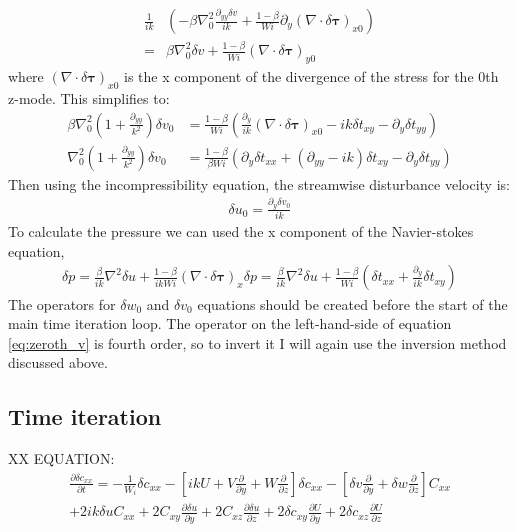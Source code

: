 \documentclass[12pt,a4paper]{article}
\newcommand{\dy}[1]{\frac{\partial #1}{\partial y}}
\newcommand{\dz}[1]{\frac{\partial #1}{\partial z}}
\newcommand{\dt}[1]{\frac{\partial #1}{\partial t}}
\newcommand{\scxy}{\delta c_{xy}}
\newcommand{\scxz}{\delta c_{xz}}
\newcommand{\stxx}{\delta t_{xx}}
\newcommand{\styy}{\delta t_{yy}}
\newcommand{\stxy}{\delta t_{xy}}
\newcommand{\su}{\delta u}
\newcommand{\sv}{\delta v}
\newcommand{\sw}{\delta w}
\newcommand{\spr}{\delta p}
\newcommand{\Wi}{\frac{1}{W_{i}}}
\newcommand{\first}[2]{-\Wi \delta c_{#1 #2} - \left[ ikU
+ V\frac{\partial}{\partial y} + W\frac{\partial}{\partial z} \right] \delta c_{#1 #2} 
- \left[ \sv\frac{\partial }{\partial y} + \sw\frac{\partial }{\partial z} \right] C_{#1 #2}}
\newcommand{\dd}[1]{\partial_{#1}}
\begin{document}
\begin{align}
    \frac{1}{ik} & \left( - \beta \nabla_{0}^{2} \frac{\dd{yy} \sv}{ik} + \frac{1-\beta}{Wi} \dd{y} \left( \nabla \cdot \delta \mathbf{\tau} \right)_{x0} \right) \nonumber\\
    = & \beta \nabla_{0}^{2} \sv + \frac{1-\beta}{Wi}\left( \nabla \cdot \delta \mathbf{\tau} \right)_{y0} 
\end{align}
where $\left( \nabla \cdot \delta \mathbf{\tau} \right)_{x0}$ is the x component of the divergence of the stress for the 0th z-mode. This simplifies to:
\begin{align}
    \beta\nabla_{0}^{2}\left( 1+ \frac{\dd{yy}}{k^{2}} \right)\sv_{0} &= \frac{1-\beta}{Wi}\left( \frac{\dd{y}}{ik} \left( \nabla \cdot \delta \mathbf{\tau} \right)_{x0} - ik\stxy - \dd{y}\styy \right) \nonumber \\
    \nabla_{0}^{2}\left( 1+ \frac{\dd{yy}}{k^{2}} \right)\sv_{0} &= \frac{1-\beta}{\beta Wi}\left( \dd{y} \stxx + \left( \dd{yy} - ik \right) \stxy - \dd{y} \styy \right)
    \label{eq:zeroth_v}
\end{align}
Then using the incompressibility equation, the streamwise disturbance velocity is:
\begin{align}
    \su_{0} = \frac{\dd{y}\sv_{0}}{ik} 
\end{align}
To calculate the pressure we can used the x component of the Navier-stokes equation,
\begin{align}
    \spr = \frac{\beta}{ik}\nabla^{2}\su + \frac{1-\beta}{ikWi}\left( \nabla \cdot \delta \mathbf{\tau} \right)_{x}
    \spr =  \frac{\beta}{ik}\nabla^{2}\su + \frac{1-\beta}{Wi}\left( \stxx + \frac{\dd{y}}{ik}\stxy\right)
\end{align}
The operators for $\sw_{0}$ and $\sv_{0}$ equations should be created before the start of the main time iteration loop. The operator on the left-hand-side of equation \ref{eq:zeroth_v} is fourth order, so to invert it I will again use the inversion method discussed above.

\subsection{Time iteration}

\noindent XX EQUATION:
\begin{align}
    \dt{\delta c_{xx}}  = \first{x}{x} \nonumber\\
+ 2ik\su C_{xx} + 2C_{xy} \dy{\su} + 2C_{xz} \dz{\su} + 2\scxy \dy{U} + 2\scxz \dz{U}
\end{align}
\end{document}

